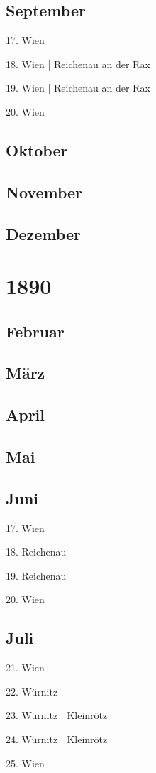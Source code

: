 \documentclass[twoside=false,titlepage=false,open=any, parskip=never, fontsize=10pt, headings=small, chapterprefix=false, appendixprefix=false, DIV=15]{scrbook}
\begin{document}
\begin{multicols}{3}
            \section*{September}
            17. Wien\par
            18. Wien | Reichenau an der Rax\par
            19. Wien | Reichenau an der Rax\par
            20. Wien\par
            \section*{Oktober}
            \section*{November}
            \section*{Dezember}
            \chapter*{1890}
            \section*{Februar}
            \section*{März}
            \section*{April}
            \section*{Mai}
            \section*{Juni}
            17. Wien\par
            18. Reichenau\par
            19. Reichenau\par
            20. Wien\par
            \section*{Juli}
            21. Wien\par
            22. Würnitz\par
            23. Würnitz | Kleinrötz\par
            24. Würnitz | Kleinrötz\par
            25. Wien\par

\end{multicols}
\end{document}
